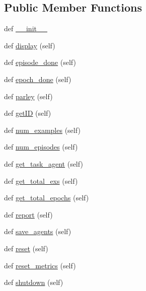 \subsection*{Public Member Functions}
\begin{DoxyCompactItemize}
\item 
def \hyperlink{classparlai_1_1core_1_1worlds_1_1HogwildWorld_abc9321ac2153a0368c84354f1a89f836}{\+\_\+\+\_\+init\+\_\+\+\_\+}
\item 
def \hyperlink{classparlai_1_1core_1_1worlds_1_1HogwildWorld_a1b7aed0a7b56712f22ee8b04c65d7c00}{display} (self)
\item 
def \hyperlink{classparlai_1_1core_1_1worlds_1_1HogwildWorld_a0425099fbc33cb97d6fbe67dbd2e8a1f}{episode\+\_\+done} (self)
\item 
def \hyperlink{classparlai_1_1core_1_1worlds_1_1HogwildWorld_ae80d3f592818ac39b9cf8802270d8d8a}{epoch\+\_\+done} (self)
\item 
def \hyperlink{classparlai_1_1core_1_1worlds_1_1HogwildWorld_a9853e25a58444d4516c3f6da8c44d9c2}{parley} (self)
\item 
def \hyperlink{classparlai_1_1core_1_1worlds_1_1HogwildWorld_a67379773119cebd6ac70fce2abcb19a9}{get\+ID} (self)
\item 
def \hyperlink{classparlai_1_1core_1_1worlds_1_1HogwildWorld_ae488971481ec6c8ba803b2404ad70e56}{num\+\_\+examples} (self)
\item 
def \hyperlink{classparlai_1_1core_1_1worlds_1_1HogwildWorld_ae0b4dc3d2bb4d1dbda7970da03da1a6e}{num\+\_\+episodes} (self)
\item 
def \hyperlink{classparlai_1_1core_1_1worlds_1_1HogwildWorld_a7dfc60f5229da37574c31479a0b2ce3a}{get\+\_\+task\+\_\+agent} (self)
\item 
def \hyperlink{classparlai_1_1core_1_1worlds_1_1HogwildWorld_a0e26cfad1c63628cb43f554c470426b9}{get\+\_\+total\+\_\+exs} (self)
\item 
def \hyperlink{classparlai_1_1core_1_1worlds_1_1HogwildWorld_a6bc364b91906b14d792957c8eeed5206}{get\+\_\+total\+\_\+epochs} (self)
\item 
def \hyperlink{classparlai_1_1core_1_1worlds_1_1HogwildWorld_a11c6831feb2a54a0d9513b4a514d4097}{report} (self)
\item 
def \hyperlink{classparlai_1_1core_1_1worlds_1_1HogwildWorld_a1f7e4c566078aebdb5e837c6fed62b17}{save\+\_\+agents} (self)
\item 
def \hyperlink{classparlai_1_1core_1_1worlds_1_1HogwildWorld_ae72983e6af34391880979491ced1dde6}{reset} (self)
\item 
def \hyperlink{classparlai_1_1core_1_1worlds_1_1HogwildWorld_ae57e2b90771c0feaa0496cb2885eae6d}{reset\+\_\+metrics} (self)
\item 
def \hyperlink{classparlai_1_1core_1_1worlds_1_1HogwildWorld_a3960deb08a179884b1eea2e423437db2}{shutdown} (self)
\end{DoxyCompactItemize}
